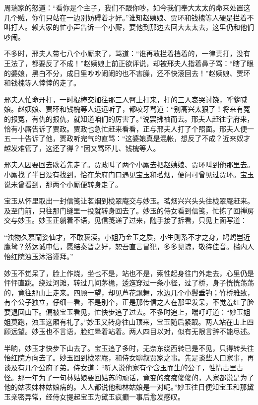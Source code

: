 \documentclass[12pt,oneside]{book}
\begin{document}
周瑞家的怒道：“看你是个主子，我们不跟你吵，如今我们奉大太太的命来处置这几个贼，你们只站在一边别妨碍着才好。”谁知赵姨娘、贾环和钱槐等人硬是拦着不叫打人。赖大家的忙小声告诉一个小厮，要他到那边去回大太太去，这里仍和他们吵闹。

不多时，邢夫人带七八个小厮来了，骂道：“谁再敢拦着挡着的，一律责打，没有王法了，都要反了不成！”赵姨娘上前正欲评说，却被邢夫人指着鼻子骂：“瞎了眼的婆娘，黑白不分，成日里吵吵闹闹的也不害臊，还不快滚回去！”赵姨娘、贾环和钱槐等人悻悻的走了。

邢夫人忙命开打，一时棍棒交加往那三人臀上打来，打的三人哀哭讨饶，呼爹喊娘。赵姨娘、贾环和钱槐等人远远听了，都咬牙骂道：“别高兴太狠了！将来有冤的报冤，有仇的报仇，就知道咱们的厉害了。”说罢拂袖而去。邢夫人赶往宁府来，恰有小厮告诉了贾政。贾政也急忙赶来看看，正与邢夫人打了个照面。邢夫人便一五一十告诉了他，贾政听完气的直骂：“这婆娘真是混帐，想反了不成？近来奴才越发难管了，这还了得？”因又骂环儿、钱槐等人。

邢夫人因要回去歇着先走了。贾政叫了两个小厮去把赵姨娘、贾环叫到他那里去。小厮找了半日没有找到，恰在荣府门口遇见宝玉和茗烟，便问可曾见过贾环。宝玉说未曾看到，那两个小厮便转身走了。

宝玉从怀里取出一封信笺让茗烟到栊翠庵交与妙玉。茗烟兴兴头头往栊翠庵赶来。及至门前，只往那门缝里一投就转身回去了。妙玉的侍女看到信笺，忙拣了回禅房交与妙玉。妙玉正躺着不语，见信笺递了过来，随手接了拆看，只见上面写道：

“浊物久慕蘭姿仙才，不敢亵渎。小姐乃金玉之质，小生则系不才之身，鸠鸩岂近鹰鸷？然达诚申信，愿结秦晋之好，恕吾直言冒犯，多多见谅，敬待佳音。槛内人怡红院浊玉沐浴谨拜。”

妙玉不觉呆了，脸上作烧，坐也不是，站也不是，索性起身往门外走去，心里仍是怦怦直跳。绕过河滩，转过几间茅檐，逶迤穿过一条小径，过了桥，身子恍恍荡荡的，竟往那山上走来。四顾一望，却见芦花飘舞，水边几个小鬟垂钓；竹桥雅致，有个公子独立，仔细一看，不是别个，正是那传信之人在那里发呆，不觉羞红了脸要退回山下。偏被宝玉看见，忙快步追了过去。不多时追上，喘吁吁道：“妙玉姐姐莫跑，浊玉这厢有礼了。”妙玉又转身往山顶来，宝玉随后紧跟。两人站在山上四顾远望。妙玉也不言语，脸红晕着站着。两人四目以对，似有无限言辞不能尽述。

半晌，妙玉才快步下山去了。宝玉追了多时，无奈东绕西转已是不见，只得转头往怡红院方向去了。妙玉回到栊翠庵，和侍女聊叙贾家之事。先是谈些人口家事，再谈及有几个公府子弟。侍女道：“听人说他家有个含玉而生的公子，性情古里古怪。那一年为了一句林姑娘要回姑苏的顽话，竟变的痴痴傻傻的，人家都说是为了他的姑表妹林姑娘病的。人人都说他和林姑娘是一对呢。”妙玉往日便知宝玉和那黛玉亲密异常，经侍女提起宝玉为黛玉疯癫一事后愈发感叹。
\end{document}
